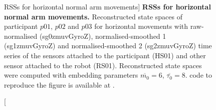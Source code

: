 \begin{figure}
\caption
	[RSSs for horizontal normal arm movements]{
	{\bf RSSs for horizontal normal arm movements.}
	Reconstructed state spaces %
	of participant $p01$, $p02$ and $p03$ for horizontal movements 
	with raw-normalised (sg0zmuvGyroZ), 
	normalised-smoothed 1 (sg1zmuvGyroZ) and 
	normalised-smoothed 2 (sg2zmuvGyroZ) time series of the 
	sensors attached to the participant (HS01) and other sensor 
	attached to the robot (RS01).	
	Reconstructed state spaces were computed with 
	embedding parameters $\overline{m_0}=6$, $\overline{\tau_0}=8$.
	\R code to reproduce the figure is available at 
	.
        }
    \label{fig:rss_HN}
\end{figure}

